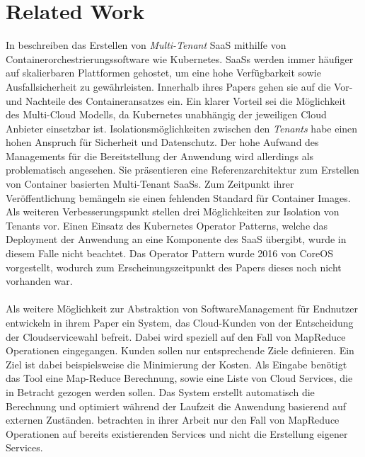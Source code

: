\section{Related Work}
\label{sec:fazit_ausblick:related_work}

In \cite{Truyen2016} beschreiben \citeauthor{Truyen2016}
das Erstellen von \emph{Multi-Tenant}
\acf{SaaS} mithilfe von Containerorchestrierungssoftware wie Kubernetes.
\acp{SaaS} werden immer häufiger auf skalierbaren Plattformen gehostet, um eine hohe Verfügbarkeit sowie Ausfallsicherheit zu gewährleisten.
Innerhalb ihres Papers gehen sie auf die Vor- und Nachteile des Containeransatzes ein.
Ein klarer Vorteil sei die Möglichkeit des Multi-Cloud Modells, da Kubernetes unabhängig der jeweiligen Cloud Anbieter einsetzbar ist.
Isolationsmöglichkeiten zwischen den \emph{Tenants} habe einen hohen Anspruch für Sicherheit und Datenschutz.
Der hohe Aufwand des Managements für die Bereitstellung der Anwendung wird allerdings als problematisch angesehen.
Sie präsentieren eine Referenzarchitektur zum Erstellen von Container basierten Multi-Tenant \acp{SaaS}.
Zum Zeitpunkt ihrer Veröffentlichung bemängeln sie einen fehlenden Standard für Container Images.
Als weiteren Verbesserungspunkt stellen \citeauthor{Truyen2016} drei Möglichkeiten zur Isolation von Tenants vor.
Einen Einsatz des Kubernetes Operator Patterns, welche das Deployment der Anwendung an eine Komponente des \acf{SaaS} übergibt,
wurde in diesem Falle nicht beachtet. Das Operator Pattern wurde 2016 von CoreOS vorgestellt, wodurch zum Erscheinungszeitpunkt
des Papers dieses noch nicht vorhanden war.

\paragraph{}
Als weitere Möglichkeit zur Abstraktion von SoftwareManagement für Endnutzer entwickeln \citeauthor{Wieder2012} in ihrem Paper
\cite{Wieder2012} ein System, das Cloud-Kunden von der Entscheidung der Cloudservicewahl befreit.
Dabei wird speziell auf den Fall von MapReduce Operationen eingegangen. Kunden sollen nur entsprechende Ziele definieren.
Ein Ziel ist dabei beispielsweise die Minimierung der Kosten.
Als Eingabe benötigt das Tool eine Map-Reduce Berechnung, sowie eine Liste von Cloud Services, die in Betracht gezogen werden sollen.
Das System erstellt automatisch die Berechnung und optimiert während der Laufzeit die Anwendung basierend auf externen Zuständen.
\citeauthor{Wieder2012} betrachten in ihrer Arbeit nur den Fall von MapReduce Operationen auf bereits existierenden Services
und nicht die Erstellung eigener Services.


